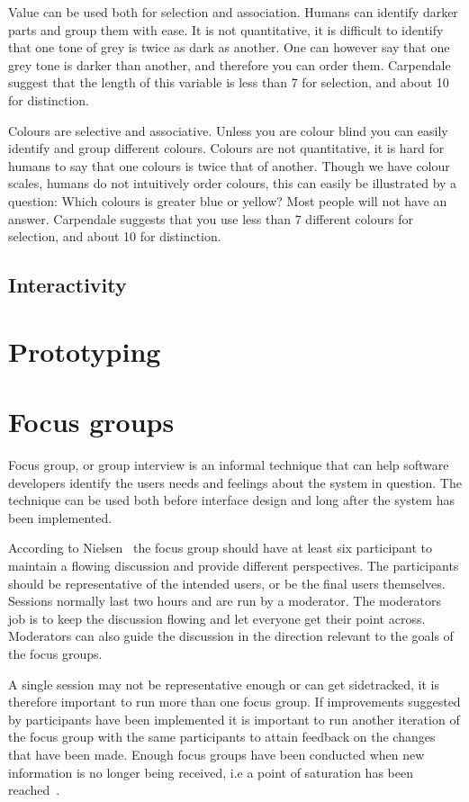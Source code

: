 Value can be used both for selection and association. Humans can identify darker parts and group them with ease. It is not quantitative, it is difficult to identify that one tone of grey is twice as dark as another. One can however say that one grey tone is darker than another, and therefore you can order them. Carpendale suggest that the length of this variable is less than 7 for selection, and about 10 for distinction.

Colours are selective and associative. Unless you are colour blind you can easily identify and group different colours. Colours are not quantitative, it is hard for humans to say that one colours is twice that of another. Though we have colour scales, humans do not intuitively order colours, this can easily be illustrated by a question: Which colours is greater blue or yellow? Most people will not have an answer. Carpendale suggests that you use less than 7 different colours for selection, and about 10 for distinction.

\subsection{Interactivity}

\section{Prototyping}

\section{Focus groups}
Focus group, or group interview is an informal technique that can help software developers identify the users needs and feelings about the system in question. The technique can be used both before interface design and long after the system has been implemented. 

According to Nielsen~\cite{focusGroup} the focus group should have at least six participant to maintain a flowing discussion and provide different perspectives. The participants should be representative of the intended users, or be the final users themselves. Sessions normally last two hours and are run by a moderator. The moderators job is to keep the discussion flowing and let everyone get their point across. Moderators can also guide the discussion in the direction relevant to the goals of the focus groups. 

A single session may not be representative enough or can get sidetracked, it is therefore important to run more than one focus group. If improvements suggested by participants have been implemented it is important to run another iteration of the focus group with the same participants to attain feedback on the changes that have been made. Enough focus groups have been conducted when new information is no longer being received, i.e a point of saturation has been reached~\cite{howFocusGroup}. 

